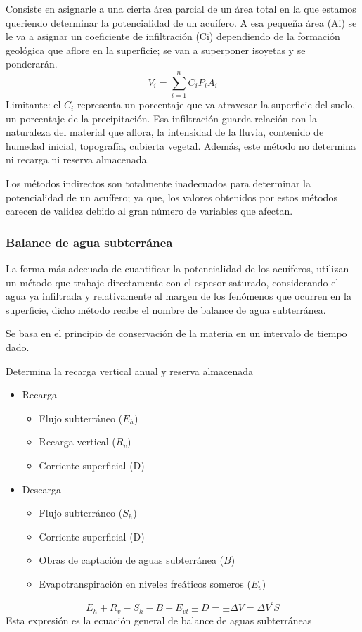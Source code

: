 Consiste en asignarle a una cierta área parcial de un área total en la que estamos queriendo determinar la potencialidad de un acuífero. A esa pequeña área (Ai) se le va a asignar un coeficiente de infiltración (Ci) dependiendo de la formación geológica que aflore en la superficie; se van a superponer isoyetas y se ponderarán.
\begin{equation}
    V_i= \sum_{i=1}^n C_iP_i A_i
\end{equation}
Limitante: el $C_i$ representa un porcentaje que va atravesar la superficie del suelo, un porcentaje de la precipitación. Esa infiltración guarda relación con la naturaleza del material que aflora, la intensidad de la lluvia, contenido de humedad inicial, topografía, cubierta vegetal. Además, este método no determina ni recarga ni reserva almacenada.

Los métodos indirectos son totalmente inadecuados para determinar la potencialidad de un acuífero; ya que, los valores obtenidos por estos métodos carecen de validez debido al gran número de variables que afectan.
\subsubsection{Balance de agua subterránea}
La forma más adecuada de cuantificar la potencialidad de los acuíferos, utilizan un método que trabaje directamente con el espesor saturado, considerando el agua ya infiltrada y relativamente al margen de los fenómenos que ocurren en la superficie, dicho método recibe el nombre de balance de agua subterránea.

Se basa en el principio de conservación de la materia en un intervalo de tiempo dado.

Determina la recarga vertical anual y reserva almacenada

\begin{itemize}
    \item Recarga \begin{itemize}
        \item Flujo subterráneo ($E_h$)
        \item Recarga vertical ($R_v$)
        \item Corriente superficial (D)
    \end{itemize}
    \item Descarga \begin{itemize}
        \item Flujo subterráneo ($S_h$)
        \item Corriente superficial (D)
        \item Obras de captación de aguas subterránea ($B$)
        \item Evapotranspiración en niveles freáticos someros ($E_v$)
    \end{itemize}
\end{itemize}
\begin{equation}
    E_h + R_v - S_h - B - E_{vt} \pm D = \pm \Delta V= \Delta V^{\prime}S
\end{equation}
Esta expresión es la ecuación general de balance de aguas subterráneas

